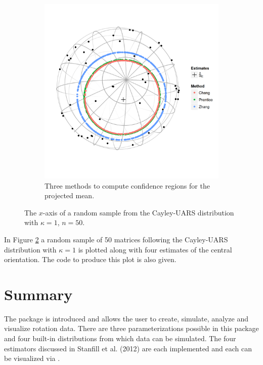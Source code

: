 \begin{figure}[h]
\begin{subfigure}[h]{.45\textwidth}
		\includegraphics[width=\textwidth]{figures/eye3}
		\caption{Three methods to compute confidence regions for the projected mean.}
		\label{fig:regs}
	\end{subfigure}
	
	\caption{\label{figure:eye1}The $x$-axis of a random sample from the Cayley-UARS distribution with $\kappa=1$, $n=50$.}
	
\end{figure}

In Figure \ref{figure:eye1} a random sample of 50 matrices following the Cayley-UARS distribution with $\kappa=1$ is plotted along with four estimates of the central orientation.  The code to produce this plot is also given.

\section{Summary}

The  package is introduced and allows the user to create, simulate, analyze and visualize rotation data.  There are three parameterizations possible in this package and four built-in distributions from which data can be simulated.  The four estimators discussed in Stanfill et al. (2012) are each implemented and each can be visualized via .


